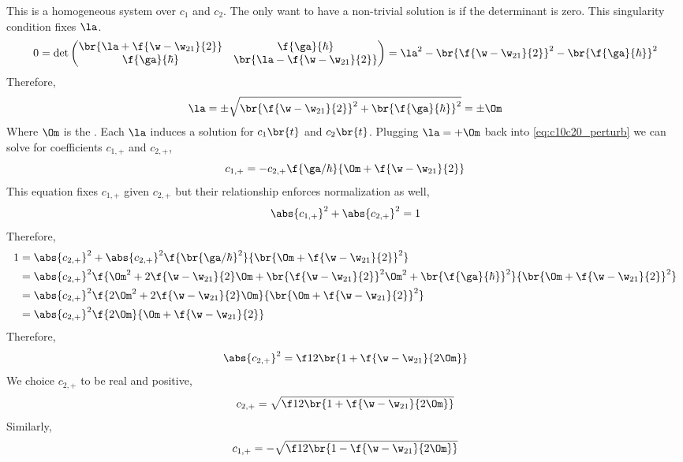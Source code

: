 \documentclass{article}
\begin{document}
This is a homogeneous system over $c_1$ and $c_2$. The only want to have a non-trivial solution is if the determinant is zero. This singularity condition fixes $\la$.
\[ 0 = \det \begin{pmatrix}
    \br{\la + \f{\w - \w_{21}}{2}} & \f{\ga}{\hbar} \\
    \f{\ga}{\hbar} & \br{\la - \f{\w - \w_{21}}{2}} \\
\end{pmatrix} = \la^2 - \br{\f{\w - \w_{21}}{2}}^2 - \br{\f{\ga}{\hbar}}^2 \]
Therefore,
\[ \la = \pm \sqrt{\br{\f{\w - \w_{21}}{2}}^2 + \br{\f{\ga}{\hbar}}^2} = \pm \Om \]
Where $\Om$ is the . Each $\la$ induces a solution for $c_1\br{t}$ and $c_2\br{t}$. Plugging $\la = +\Om$ back into \cref{eq:c10c20_perturb} we can solve for coefficients $c_{1, +}$ and $c_{2, +}$,
\[ c_{1,+} = - c_{2,+} \f{\ga / \hbar}{\Om + \f{\w - \w_{21}}{2}} \]
This equation fixes $c_{1,+}$ given $c_{2,+}$ but their relationship enforces normalization as well,
\[  \abs{c_{1,+}}^2 + \abs{c_{2,+}}^2 = 1 \]
Therefore,
\begin{align*}
1
&= \abs{c_{2,+}}^2 + \abs{c_{2,+}}^2\f{\br{\ga / \hbar}^2}{\br{\Om + \f{\w - \w_{21}}{2}}^2} \\
&= \abs{c_{2,+}}^2 \f{\Om^2 + 2 \f{\w - \w_{21}}{2} \Om + \br{\f{\w - \w_{21}}{2}}^2 \Om^2 + \br{\f{\ga}{\hbar}}^2}{\br{\Om + \f{\w - \w_{21}}{2}}^2} \\
&= \abs{c_{2,+}}^2 \f{2\Om^2 + 2 \f{\w - \w_{21}}{2} \Om}{\br{\Om + \f{\w - \w_{21}}{2}}^2} \\
&= \abs{c_{2,+}}^2 \f{2\Om}{\Om + \f{\w - \w_{21}}{2}}
\end{align*}
Therefore,
\[ \abs{c_{2,+}}^2 = \f12 \br{1 + \f{\w - \w_{21}}{2 \Om}} \]
We choice $c_{2,+}$ to be real and positive,
\[ c_{2,+} = \sqrt{\f12 \br{1 + \f{\w - \w_{21}}{2 \Om}}} \]
Similarly,
\[ c_{1,+} = -\sqrt{\f12 \br{1 - \f{\w - \w_{21}}{2 \Om}}} \]
\end{document}
